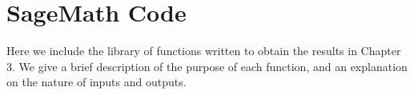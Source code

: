 \chapter{SageMath Code}
\label{app:code}
\lstset{language=Python} 


Here we include the library of functions written to obtain the results in Chapter 3. We give a brief description of the purpose of each function, and an explanation on the nature of inputs and outputs.

